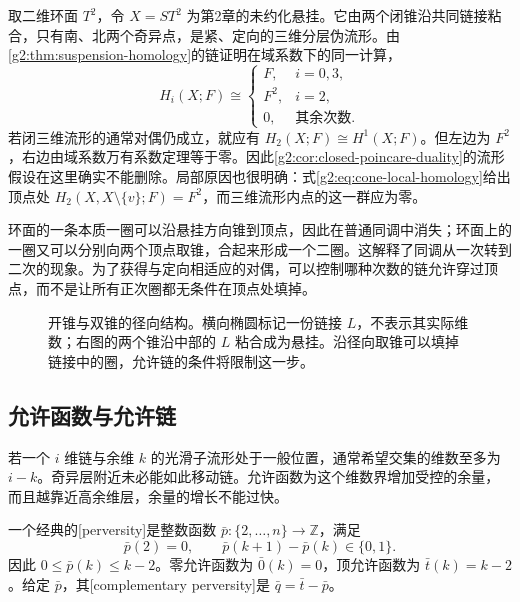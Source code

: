 \begin{example}\label{g2:exm:suspended-torus-duality-failure}
	取二维环面 \(T^2\)，令 \(X=ST^2\) 为第2章的未约化悬挂。它由两个闭锥沿共同链接粘合，只有南、北两个奇异点，是紧、定向的三维分层伪流形。由\cref{g2:thm:suspension-homology}的链证明在域系数下的同一计算，
	\[
		H_i(X;F)\cong
		\begin{cases}
			F,&i=0,3,\\
			F^2,&i=2,\\
			0,&\text{其余次数}.
		\end{cases}
	\]
	若闭三维流形的通常对偶仍成立，就应有 \(H_2(X;F)\cong H^1(X;F)\)。但左边为 \(F^2\)，右边由域系数万有系数定理等于零。因此\cref{g2:cor:closed-poincare-duality}的流形假设在这里确实不能删除。局部原因也很明确：式\eqref{g2:eq:cone-local-homology}给出顶点处 \(H_2(X,X\setminus\{v\};F)=F^2\)，而三维流形内点的这一群应为零。
\end{example}

环面的一条本质一圈可以沿悬挂方向锥到顶点，因此在普通同调中消失；环面上的一圈又可以分别向两个顶点取锥，合起来形成一个二圈。这解释了同调从一次转到二次的现象。为了获得与定向相适应的对偶，可以控制哪种次数的链允许穿过顶点，而不是让所有正次圈都无条件在顶点处填掉。

\begin{figure}[htbp]
	\centering
	
	\caption{开锥与双锥的径向结构。横向椭圆标记一份链接 \(L\)，不表示其实际维数；右图的两个锥沿中部的 \(L\) 粘合成为悬挂。沿径向取锥可以填掉链接中的圈，允许链的条件将限制这一步。}
	\label{g2:fig:cone-suspension-models}
\end{figure}

\subsection{允许函数与允许链}
\label{g2:subsec:B03:02}

若一个 \(i\) 维链与余维 \(k\) 的光滑子流形处于一般位置，通常希望交集的维数至多为 \(i-k\)。奇异层附近未必能如此移动链。允许函数为这个维数界增加受控的余量，而且越靠近高余维层，余量的增长不能过快。

\begin{definition}\label{g2:def:gm-perversity}
	一个经典的[perversity]是整数函数 \(\bar p:\{2,\ldots,n\}\to\mathbb Z\)，满足
	\[
		\bar p(2)=0,\qquad
		\bar p(k+1)-\bar p(k)\in\{0,1\}.
	\]
	因此 \(0\le\bar p(k)\le k-2\)。零允许函数为 \(\bar0(k)=0\)，顶允许函数为 \(\bar t(k)=k-2\)。给定 \(\bar p\)，其[complementary perversity]是 \(\bar q=\bar t-\bar p\)。
\end{definition}

